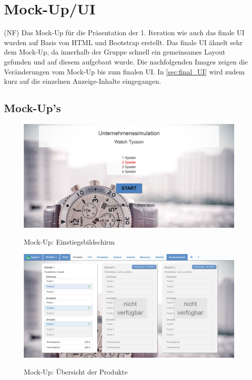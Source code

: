 \chapter{Mock-Up/UI}
(NF) Das Mock-Up für die Präsentation der 1. Iteration wie auch das finale UI wurden auf Basis von HTML und Bootstrap erstellt. Das finale UI ähnelt sehr dem Mock-Up, da innerhalb der Gruppe schnell ein gemeinsames Layout gefunden und auf diesem aufgebaut wurde. Die nachfolgenden Images zeigen die Veränderungen vom Mock-Up bis zum finalen UI. In \ref{sec:final_UI} wird zudem kurz auf die einzelnen Anzeige-Inhalte eingegangen.  
\section{Mock-Up's}
\begin{figure} [h]
	\centering
	\includegraphics[scale=0.1]{img/bilder_layout/MockUp1.jpg}
	\label{fig:abb4}
	\caption{Mock-Up: Einstiegsbildschirm} 
\end{figure}
\begin{figure}
	\centering
	\includegraphics[scale=0.1]{img/bilder_layout/MockUp2.jpg}
	\label{fig:abb5}
	\caption{Mock-Up: Übersicht der Produkte} 
\end{figure}
